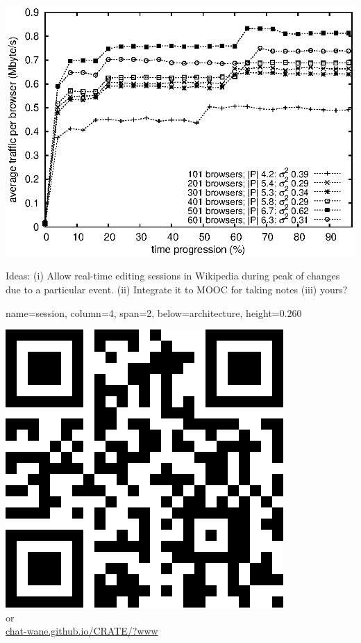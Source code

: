 \documentclass[a1paper, fontscale=0.4, portrait]{baposter}
\newcommand{\THIRDROW}{0.260}
\begin{document}
\begin{poster}
{\begin{minipage}[c]{.5\linewidth}
    \end{minipage} \hfill
    \begin{minipage}[c]{.5\linewidth}
      \centering
      \includegraphics[scale=0.5]{img/traffic.eps}
    \end{minipage}

    Ideas: (i) Allow real-time editing sessions in Wikipedia during peak of
    changes due to a particular event. (ii) Integrate it to MOOC for taking
    notes (iii) yours?
  }

  {name=session, column=4, span=2, below=architecture, height=\THIRDROW} {
    \begin{center}
      \includegraphics[scale=0.25]{img/qrcode.png}
      \\or\\
      \url{chat-wane.github.io/CRATE/?www}
    \end{center}
  }

\end{poster}
\end{document}
